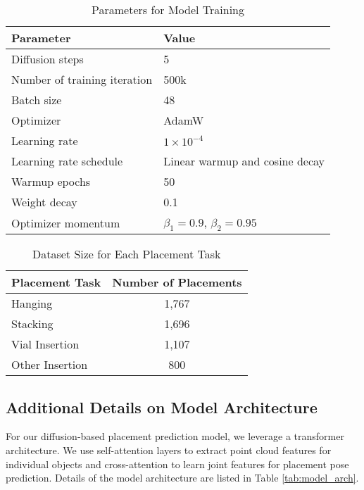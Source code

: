 \begin{table}[h!]
    \centering
    \normalsize
    \caption{Parameters for Model Training}
    \renewcommand{\arraystretch}{1.2}
    \label{tab:model_train}
    \begin{tabular}{@{}ll@{}}
        \toprule
        \textbf{Parameter} & \textbf{Value} \\ 
        \midrule
        Diffusion steps & 5\\
        Number of training iteration & 500k\\
        Batch size & 48 \\ 
        Optimizer & AdamW \cite{loshchilov2019decoupledweightdecayregularization}\\ 
        Learning rate & \( 1 \times 10^{-4} \) \\ 
        Learning rate schedule & Linear warmup and cosine decay \\ 
        Warmup epochs & 50 \\ 
        Weight decay & 0.1 \\ 
        Optimizer momentum & \( \beta_1 = 0.9 \), \( \beta_2 = 0.95 \) \\ 
        \bottomrule
    \end{tabular}
\end{table}

\begin{table}[h!]
    \normalsize
    \centering
    \caption{Dataset Size for Each Placement Task}
    \renewcommand{\arraystretch}{1.2}
    \label{tab:dataset}
    \begin{tabular}{@{}l c@{}}
        \toprule
        \textbf{Placement Task} & \textbf{Number of Placements} \\ 
        \midrule
        Hanging & 1,767\\
        Stacking & 1,696\\
        Vial Insertion & 1,107 \\ 
        Other Insertion & 800\\ 
        \bottomrule
    \end{tabular}
\end{table}


\subsection{Additional Details on Model Architecture}
For our diffusion-based placement prediction model, we leverage a transformer architecture. We use self-attention layers to extract point cloud features for individual objects and cross-attention to learn joint features for placement pose prediction. Details of the model architecture are listed in Table \ref{tab:model_arch}. 




